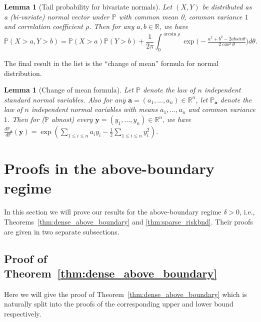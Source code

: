 \documentclass[11pt,reqno,letterpaper]{amsart}
\numberwithin{equation}{section}
\theoremstyle{plain}
\newtheorem{lemma}[theorem]{Lemma}
\def \P{\mathbb{P}}
\def \R{\mathbb{R}}
\begin{document}
\begin{lemma}[Tail probability for bivariate normals]\label{lem:bvn}
Let $(X, Y)$ be distributed as a (bi-variate) normal vector under $\P$ with common mean 0, common variance $1$ and correlation coefficient $\rho$. Then for any $a, b \in \R$, we have
\begin{equation}\label{eq:bvn}
\P(X > a, Y > b) = \P(X > a) \P(Y > b) + \frac 1{2\pi}\int_0^{\arcsin{\rho}} \exp\big(-\tfrac{a^2 + b^2 - 2ab sin\theta}{2\cos^2\theta} \big) d\theta.
\end{equation}
\end{lemma}
The final result in the list is the ``change of mean'' formula for normal 
distribution.
\begin{lemma}[Change of mean formula]\label{lem:CM}
Let $\P$ denote the law of $n$ independent standard normal variables. Also for 
any $\mathbf a = (a_1, \ldots, a_n) \in \R^n$, let $\P_{\mathbf a}$ denote the law 
of $n$ independent normal variables with means $a_1, \ldots, a_n$ and common 
variance $1$. Then for ($\P$ almost) every $\mathbf y = (y_1, \ldots, y_n) \in \R^n$, we have $\frac{d\P_{\mathbf a}}{d\P}(\mathbf y) = \exp( \sum_{1 \le i \le n} a_i y_i - \frac12\sum_{1 \le i \le n} y_i^2)$.
\end{lemma}

\section{Proofs in the above-boundary regime}\label{sec:dense_above}
In this section we will prove our results for the above-boundary regime $\delta > 0$, i.e., Theorems~\ref{thm:dense_above_boundary} and \ref{thm:sparse_riskbnd}. 
Their proofs are given in two separate subsections.
\subsection{Proof of Theorem~\ref{thm:dense_above_boundary}}\label{subsec:dense_above}
Here we will give the proof of %
Theorem~\ref{thm:dense_above_boundary} which is naturally split into the proofs of 
the corresponding upper and lower bound respectively.
\end{document}

